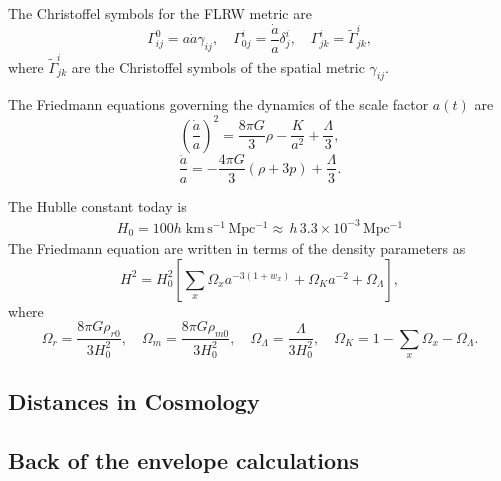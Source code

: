 The Christoffel symbols for the FLRW metric are
\begin{equation}
    \Gamma^0_{ij} = a\dot{a} \gamma_{ij}, \quad
    \Gamma^i_{0j} = \frac{\dot{a}}{a} \delta^i_j, \quad
    \Gamma^i_{jk} = \tilde{\Gamma}^i_{jk},
\end{equation}
where $\tilde{\Gamma}^i_{jk}$ are the Christoffel symbols of the spatial metric $\gamma_{ij}$.


The Friedmann equations governing the dynamics of the scale factor $a(t)$ are
\begin{equation}
    \left( \frac{\dot{a}}{a} \right)^2 = \frac{8\pi G}{3} \rho - \frac{K}{a^2} + \frac{\Lambda}{3},
\end{equation}
\begin{equation}
    \frac{\ddot{a}}{a} = -\frac{4\pi G}{3} (\rho + 3p) + \frac{\Lambda}{3}.
\end{equation}

The Hublle constant today is
\begin{align}
    H_0 = 100 h \; \mathrm{km \, s^{-1} \, Mpc^{-1}} \approx\, h \,3.3 \times 10^{-3} \, \mathrm{Mpc^{-1}}
\end{align}
The Friedmann equation are written in terms of the density parameters as
\begin{equation}
    H^2 = H_0^2 \left[ \sum_x \Omega_x a^{-3(1+w_x)} + \Omega_K a^{-2} + \Omega_\Lambda \right],
\end{equation}
where
\begin{equation}
    \Omega_r = \frac{8\pi G \rho_{r0}}{3H_0^2}, \quad
    \Omega_m = \frac{8\pi G \rho_{m0}}{3H_0^2}, \quad
    \Omega_\Lambda = \frac{\Lambda}{3H_0^2}, \quad
    \Omega_K = 1 - \sum_x \Omega_x - \Omega_\Lambda.
\end{equation}



\subsection{Distances in Cosmology}




\subsection{Back of the envelope calculations}


